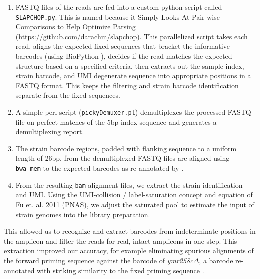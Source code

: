 \begin{enumerate}
  \setlength\itemsep{1em}
  \item
  FASTQ files of the reads are fed into a custom python script called
  \texttt{SLAPCHOP.py}. This is named because it Simply Looks At
  Pair-wise Comparisons to Help Optimize Parsing 
  (\url{https://github.com/darachm/slapchop}). This
  parallelized script takes each read, aligns the expected fixed
  sequences that bracket the informative barcodes (using
  BioPython \cite{cock2009biopython}), decides if the read matches the
  expected structure based on a specified criteria, then extracts out 
  the sample index, strain barcode, and UMI degenerate sequence into 
  appropriate positions in a FASTQ format. This keeps the filtering 
  and strain barcode identification separate from the fixed sequences.
  \item
  A simple perl script (\texttt{pickyDemuxer.pl}) demultiplexes the
  processed FASTQ file on perfect matches of the 5bp index sequence and
  generates a demultiplexing report.
  \item
  The strain barcode regions, padded with flanking sequence to a uniform
  length of 26bp, from the demultiplexed FASTQ files are aligned using
  \texttt{bwa\ mem} \parencite{li2013aligning}
  to the
  expected barcodes as re-annotated by \cite{smith2009quantiative}.
  \item
  From the resulting \texttt{bam} alignment files, we extract the strain
  identification and UMI. Using the UMI-collision / label-saturation
  concept and equation of Fu et. al. 2011 (PNAS), we adjust the
  saturated pool to estimate the input of strain genomes into the
  library preparation.
\end{enumerate}

This allowed us to recognize and extract barcodes from indeterminate
positions in the amplicon and filter the reads for real, intact
amplicons in one step. This extraction improved our accuracy, for
example eliminating spurious alignments of the forward priming sequence
against the barcode of \emph{ymr258c}\(\Delta\), a barcode re-annotated
with striking similarity to the fixed priming sequence
\cite{smith2009quantitative}.

